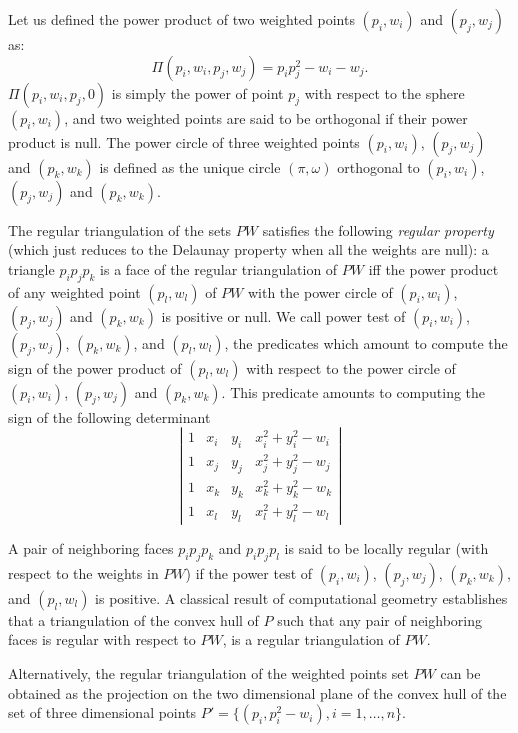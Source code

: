 Let us defined the power product of two weighted points
$(p_i, w_i)$ and $(p_j, w_j)$ as:
\[\Pi(p_i, w_i,p_j, w_j) = p_ip_j ^2 - w_i  - w_j  .\]
$\Pi(p_i, w_i,p_j, 0)$ is simply the power of point $p_j$
with respect to the sphere $(p_i, w_i)$, and two weighted points 
are said to be orthogonal if their power product is null.
The power circle of three weighted points
 $(p_i, w_i)$, $(p_j, w_j)$
and $(p_k, w_k)$ is defined as the unique circle
$(\pi, \omega)$  orthogonal to
 $(p_i, w_i)$, $(p_j, w_j)$
and $(p_k, w_k)$.

The regular triangulation of the sets ${  PW}$
satisfies the following {\em regular property} (which just reduces to the 
Delaunay property when all the weights are null):
a triangle $p_ip_jp_k$ is a face of the regular triangulation
of ${  PW}$ iff the power product of any weighted point
 $(p_l, w_l)$ of ${  PW}$ with the power circle of
 $(p_i, w_i)$, $(p_j, w_j)$ and $(p_k, w_k)$ is positive or null.
We call  power test of  $(p_i, w_i)$, $(p_j, w_j)$, $(p_k, w_k)$,
and $(p_l, w_l)$,  the predicates which amount to compute
the sign of 
the power product of $(p_l, w_l)$ with respect to
the power circle of
 $(p_i, w_i)$, $(p_j, w_j)$ and $(p_k, w_k)$.
This predicate amounts to computing the sign of
the following
determinant
\[\left| \begin{array}{cccc}
1  &  x_i  &  y_i  &  x_i ^2 + y_i ^2 - w_i  \\
1  &  x_j  &  y_j  &  x_j ^2 + y_j ^2 - w_j  \\
1  &  x_k  &  y_k  &  x_k ^2 + y_k ^2 - w_k  \\
1  &  x_l  &  y_l  &  x_l ^2 + y_l ^2 - w_l
\end{array}
\right|
\]

A pair of neighboring faces $p_ip_jp_k$
and $p_ip_jp_l$ is said to be locally regular
(with respect to  the weights in ${  PW}$)
if the power test of $(p_i, w_i)$, $(p_j, w_j)$, $(p_k, w_k)$,
and $(p_l, w_l)$ is positive.
A classical  result of computational geometry
establishes that a triangulation of the convex hull of ${  P}$
such that any pair of neighboring faces is regular with respect
to ${  PW}$, is a
 regular triangulation of ${  PW}$.

Alternatively, the regular triangulation
of the weighted points set ${  PW}$
can be obtained as the projection
on the two dimensional plane of the convex hull of the set of three
dimensional points 
${  P'}= \{ (p_i,p_i ^2 - w_i ), i = 1, \ldots , n \}$.

